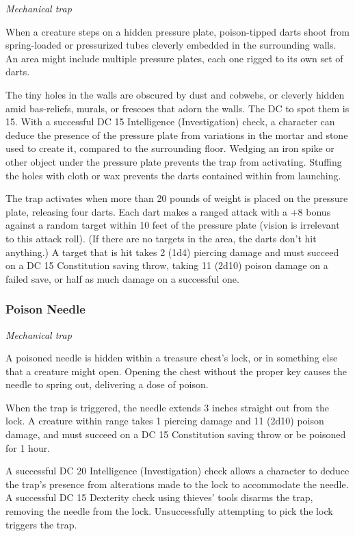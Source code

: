 \documentclass[
]{article}
\begin{document}
\emph{Mechanical trap}

When a creature steps on a hidden pressure plate, poison-tipped darts
shoot from spring-loaded or pressurized tubes cleverly embedded in the
surrounding walls. An area might include multiple pressure plates, each
one rigged to its own set of darts.

The tiny holes in the walls are obscured by dust and cobwebs, or
cleverly hidden amid bas-reliefs, murals, or frescoes that adorn the
walls. The DC to spot them is 15. With a successful DC 15 Intelligence
(Investigation) check, a character can deduce the presence of the
pressure plate from variations in the mortar and stone used to create
it, compared to the surrounding floor. Wedging an iron spike or other
object under the pressure plate prevents the trap from activating.
Stuffing the holes with cloth or wax prevents the darts contained within
from launching.

The trap activates when more than 20 pounds of weight is placed on the
pressure plate, releasing four darts. Each dart makes a ranged attack
with a +8 bonus against a random target within 10 feet of the pressure
plate (vision is irrelevant to this attack roll). (If there are no
targets in the area, the darts don't hit anything.) A target that is hit
takes 2 (1d4) piercing damage and must succeed on a DC 15 Constitution
saving throw, taking 11 (2d10) poison damage on a failed save, or half
as much damage on a successful one.

\hypertarget{poison-needle}{%
\subsubsection{Poison Needle}\label{poison-needle}}

\emph{Mechanical trap}

A poisoned needle is hidden within a treasure chest's lock, or in
something else that a creature might open. Opening the chest without the
proper key causes the needle to spring out, delivering a dose of poison.

When the trap is triggered, the needle extends 3 inches straight out
from the lock. A creature within range takes 1 piercing damage and 11
(2d10) poison damage, and must succeed on a DC 15 Constitution saving
throw or be poisoned for 1 hour.

A successful DC 20 Intelligence (Investigation) check allows a character
to deduce the trap's presence from alterations made to the lock to
accommodate the needle. A successful DC 15 Dexterity check using
thieves' tools disarms the trap, removing the needle from the lock.
Unsuccessfully attempting to pick the lock triggers the trap.
\end{document}
